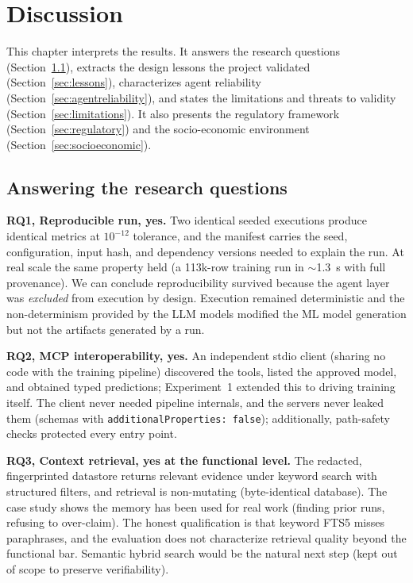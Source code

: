 \chapter{Discussion}
\label{ch:discussion}

This chapter interprets the results. It answers the research questions (Section~\ref{sec:rqanswers}), extracts the design lessons the project validated (Section~\ref{sec:lessons}), characterizes agent reliability (Section~\ref{sec:agentreliability}), and states the limitations and threats to validity (Section~\ref{sec:limitations}). It also presents the regulatory framework (Section~\ref{sec:regulatory}) and the socio-economic environment (Section~\ref{sec:socioeconomic}).

\section{Answering the research questions}
\label{sec:rqanswers}

\textbf{RQ1, Reproducible run, yes.} Two identical seeded executions produce identical metrics at $10^{-12}$ tolerance, and the manifest carries the seed, configuration, input hash, and dependency versions needed to explain the run. At real scale the same property held (a 113k-row training run in $\sim$1.3~s with full provenance). We can conclude reproducibility survived because the agent layer was \emph{excluded} from execution by design. Execution remained deterministic and the non-determinism provided by the LLM models modified the ML model generation but not the artifacts generated by a run.


\textbf{RQ2, MCP interoperability, yes.} An independent stdio client (sharing no code with the training pipeline) discovered the tools, listed the approved model, and obtained typed predictions; Experiment~1 extended this to driving training itself. The client never needed pipeline internals, and the servers never leaked them (schemas with \texttt{additionalProperties: false}); additionally, path-safety checks protected every entry point.

\textbf{RQ3, Context retrieval, yes at the functional level.} The redacted, fingerprinted datastore returns relevant evidence under keyword search with structured filters, and retrieval is non-mutating (byte-identical database). The case study shows the memory has been used for real work (finding prior runs, refusing to over-claim). The honest qualification is that keyword FTS5 misses paraphrases, and the evaluation does not characterize retrieval quality beyond the functional bar. Semantic hybrid search would be the natural next step (kept out of scope to preserve verifiability).


